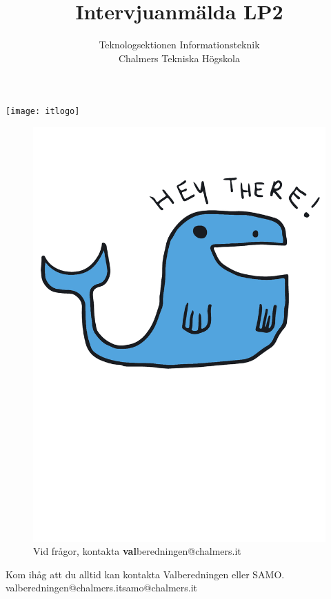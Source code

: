 \documentclass[11pt, noincludeaddress, nopagination]{classes/cthit}
\begin{document}
\thispagestyle{empty}

\title{Intervjuanmälda LP2 \the\year}
\subtitle{ \large Teknologsektionen Informationsteknik \\ Chalmers Tekniska Högskola}

\begin{center}
\texttt{[image: itlogo]}
\end{center}

\makeheadfoot%

\makesimpletitle
\vspace{1cm}

\newpage
\thispagestyle{empty}

\begin{figure}[h]
    \centering
    \includegraphics[width=\textwidth, angle=2]{whale}
    Vid frågor, kontakta \textbf{val}beredningen@chalmers.it
\end{figure}

\clearpage

\begin{center}
    Kom ihåg att du alltid kan kontakta Valberedningen eller SAMO.\\
    valberedningen@chalmers.it\hspace{25px}samo@chalmers.it
\end{center}

\begin{itemize}
   
\end{itemize}
\end{document}

